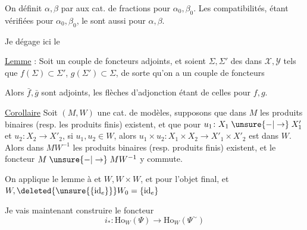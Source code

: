 On définit $\alpha,\beta$ par  aux cat. de fractions pour $\alpha_0,\beta_0$. Les compatibilités, étant vérifiées pour $\alpha_0,\beta_0$, le sont aussi pour $\alpha,\beta$. 

Je dégage ici le

\uline{Lemme}  : Soit
un couple de foncteurs adjoints, et soient $\Sigma,\Sigma'$ des  dans $\mathcal X,\mathcal Y$ tels que $f(\Sigma)\subset\Sigma'$, $g(\Sigma')\subset\Sigma$, de sorte qu'on a un couple de foncteurs

Alors $\bar f,\bar g$ sont adjoints, les flèches d'adjonction étant  de celles pour $f,g$.

\uline{Corollaire} Soit $(M,W)$ une cat. de modèles,  supposons que dans $M$ les produits binaires (resp. les produits finis) existent, et que  pour $u_1\colon X_1\mathrel{\unsure{-|\to}} X'_1$ et $u_2\colon X_2\to X'_2$, si $u_1,u_2\in W$, alors $u_1\times u_2\colon X_1\times X_2\to X'_1\times X'_2$ est dans $W$. Alors dans $MW^{-1}$ les produits binaires (resp. produits finis) existent, et le foncteur  $M\mathrel{\unsure{-|\to}} MW^{-1}$ y commute.

On applique le lemme à
et $W,W\times W$, et pour l'objet final,
et $W,\deleted{\unsure{\{\mathrm{id}_e\}}}W_0=\{\mathrm{id}_e\}$

Je vais maintenant construire le foncteur
\[
i_*\colon\mathrm{Ho}_W(\Psi)\longrightarrow\mathrm{Ho}_W(\Psi^{\sim})
\]

